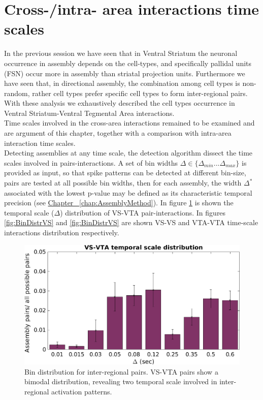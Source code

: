 \section{Cross-/intra- area interactions time scales}
\label{sec:TimeScales}
In the previous session we have seen that in Ventral Striatum the neuronal occurrence in assembly depends on the cell-types, and specifically pallidal units (FSN) occur more in assembly than striatal projection units. Furthermore we have seen that, in directional assembly, the combination among cell types is non-random, rather cell types prefer specific cell types to form inter-regional pairs.
With these analysis we exhaustively described the cell types occurrence in Ventral Striatum-Ventral Tegmental Area interactions.\\Time scales involved in the cross-area interactions remained to be examined and are argument of this chapter, together with a comparison with intra-area interaction time scales.\\
Detecting assemblies at any time scale, the detection algorithm dissect the time scales involved in pairs-interactions. A set of bin widths $\Delta \in \{\Delta_{min}...\Delta_{max}\}$ is provided as input, so that spike patterns can be detected at different bin-size, pairs are tested at all possible bin widths, then for each assembly, the width $\Delta^*$ associated with the lowest p-value may be defined as its characteristic temporal precision (see \hyperref[chap:AssemblyMethod]{Chapter~ \ref*{chap:AssemblyMethod}}).
In figure \ref{fig:BinDistr} is shown the temporal scale ($\Delta$) distribution of VS-VTA pair-interactions.
In figures \ref{fig:BinDistrVS} and \ref{fig:BinDistrVS} are shown VS-VS and VTA-VTA time-scale interactions distribution respectively.\\
\begin{figure}[H]
\includegraphics[scale=0.5]{figures/VS_VTA_Short1.png}
\caption{Bin distribution for inter-regional pairs. VS-VTA pairs show a bimodal distribution, revealing two temporal scale involved in inter-regional activation patterns.}
\label{fig:BinDistr}
\end{figure}
